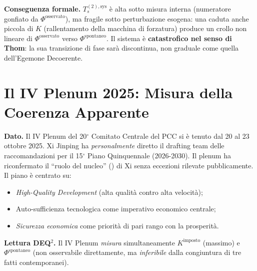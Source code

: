 \Proved{} \textbf{Conseguenza formale.} \(T_s^{(2),\text{sys}}\) è alta
sotto misura interna (numeratore gonfiato da
\(\Phi^{\text{osservato}}\)), ma fragile sotto perturbazione esogena:
una caduta anche piccola di \(K\) (rallentamento della macchina di
forzatura) produce un crollo non lineare di \(\Phi^{\text{osservato}}\)
verso \(\Phi^{\text{spontaneo}}\). Il sistema è \textbf{catastrofico nel
senso di Thom}: la sua transizione di fase sarà discontinua, non
graduale come quella dell'Egemone Decoerente.



\section{Il IV Plenum 2025: Misura della Coerenza
Apparente}\label{il-iv-plenum-2025-misura-della-coerenza-apparente}

\Proved{} \textbf{Dato.} Il IV Plenum del 20$^\circ$ Comitato Centrale del PCC
si è tenuto dal 20 al 23 ottobre 2025. Xi Jinping ha
\emph{personalmente} diretto il drafting team delle raccomandazioni per
il 15$^\circ$ Piano Quinquennale (2026-2030). Il plenum ha riconfermato il
``ruolo del nucleo'' () di Xi senza eccezioni rilevate pubblicamente. Il
piano è centrato su:

\begin{itemize}
\tightlist
\item
  \emph{High-Quality Development} (alta qualità contro alta velocità);
\item
  Auto-sufficienza tecnologica come imperativo economico centrale;
\item
  \emph{Sicurezza economica} come priorità di pari rango con la
  prosperità.
\end{itemize}

\Hypoth{} \textbf{Lettura DEQ$^2$.} Il IV Plenum \emph{misura}
simultaneamente \(K^{\text{imposto}}\) (massimo) e
\(\Phi^{\text{spontaneo}}\) (non osservabile direttamente, ma
\emph{inferibile} dalla congiuntura di tre fatti contemporanei).

